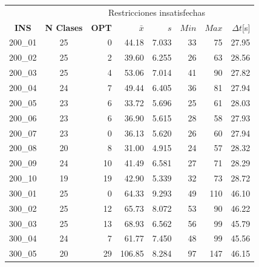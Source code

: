 
 \noindent\begin{tabular*}{\textwidth}{@{\extracolsep{\fill}} ccrrrrrr} \hline
 & & \multicolumn{5}{c}{Restricciones insatisfechas} \\
 \cline{3-7}
 	\textbf{INS} & \textbf{N Clases} & \textbf{OPT}    & $\bar{x}$ & $s$   & $Min$ & $Max$ & $\Delta t$[s] \\ \hline
 	200\_01      &             25    &              0  &  44.18    & 7.033 & 33    & 75    & 27.95     \\
 	200\_02      &             25    &              2  &  39.60    & 6.255 & 26    & 63    & 28.56     \\
 	200\_03      &             25    &              4  &  53.06    & 7.014 & 41    & 90    & 27.82     \\
 	200\_04      &             24    &              7  &  49.44    & 6.405 & 36    & 81    & 27.94     \\
 	200\_05      &             23    &              6  &  33.72    & 5.696 & 25    & 61    & 28.03     \\
 	200\_06      &             23    &              6  &  36.90    & 5.615 & 28    & 58    & 27.93     \\
 	200\_07      &             23    &              0  &  36.13    & 5.620 & 26    & 60    & 27.94     \\
 	200\_08      &             20    &              8  &  31.00    & 4.915 & 24    & 57    & 28.32     \\
 	200\_09      &             24    &             10  &  41.49    & 6.581 & 27    & 71    & 28.29     \\
 	200\_10      &             19    &             19  &  42.90    & 5.339 & 32    & 73    & 28.72     \\ \hline
 	300\_01      &             25    &              0  &  64.33    & 9.293 & 49    & 110   & 46.10     \\
 	300\_02      &             25    &             12  &  65.73    & 8.072 & 53    & 90    & 46.22     \\
 	300\_03      &             25    &             13  &  68.93    & 6.562 & 56    & 99    & 45.79     \\
 	300\_04      &             24    &              7  &  61.77    & 7.450 & 48    & 99    & 45.56     \\
 	300\_05      &             20    &             29  &  106.85   & 8.284 & 97    & 147   & 46.15     \\

\end{tabular*}
